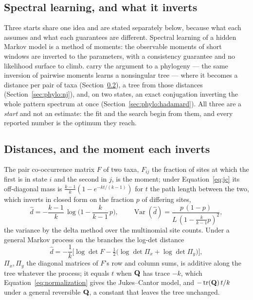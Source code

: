 \documentclass[11pt,a4paper]{article}
\begin{document}
\subsection{Spectral learning, and what it inverts}
\label{sec:spectral-start}
Three starts share one idea and are stated separately below, because what each
assumes and what each guarantees are different. Spectral learning of a hidden
Markov model \citep{hsu2012} is a method of moments: the observable moments of
short windows are inverted to the parameters, with a consistency guarantee and
no likelihood surface to climb. \citet{mossel2006} carry the argument to a
phylogeny --- the same inversion of pairwise moments learns a nonsingular
tree --- where it becomes a distance per pair of taxa
(Section~\ref{sec:phylo:distances}), a tree from those distances
(Section~\ref{sec:phylo:nj}), and, on two states, an exact conjugation
inverting the whole pattern spectrum at once
(Section~\ref{sec:phylo:hadamard}). All three are a \emph{start} and not an
estimate: the fit and the search begin from them, and every reported number is
the optimum they reach.

\subsection{Distances, and the moment each inverts}
\label{sec:phylo:distances}
The pair co-occurrence matrix $F$ of two taxa, $F_{ij}$ the fraction of sites
at which the first is in state $i$ and the second in $j$, is the moment;
under Equation~\ref{eq:jc} its off-diagonal mass is $\tfrac{k-1}{k}(1 -
e^{-kt/(k-1)})$ for $t$ the path length between the two, which inverts in
closed form on the fraction $p$ of differing sites,
\begin{equation}
  \hat d = -\frac{k-1}{k}\,\log\!\Big(1 - \frac{k}{k-1}\,p\Big),
  \qquad
  \operatorname{Var}(\hat d) = \frac{p\,(1-p)}{L\,(1 - \tfrac{k}{k-1}p)^2},
  \label{eq:jc-distance}
\end{equation}
the variance by the delta method over the multinomial site counts. Under
a general Markov process on the branches the log-det distance
\citep{steel1994}
\begin{equation}
  \hat d = -\frac{1}{k}\Big[\log\det F
    - \tfrac12\big(\log\det \Pi_x + \log\det \Pi_y\big)\Big],
  \label{eq:logdet}
\end{equation}
$\Pi_x, \Pi_y$ the diagonal matrices of $F$'s row and column sums, is
additive along the tree whatever the process; it equals $t$ when $\mathbf{Q}$ has
trace $-k$, which Equation~\ref{eq:normalization} gives the Jukes--Cantor
model, and $-\operatorname{tr}(\mathbf{Q})\,t/k$ under a general reversible $\mathbf{Q}$,
a constant that leaves the tree unchanged.
\end{document}
